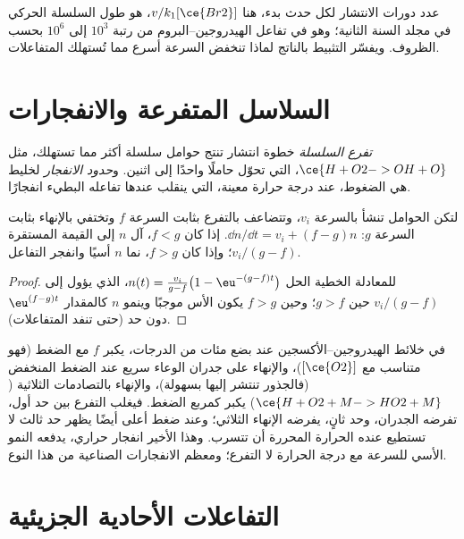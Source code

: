 عدد دورات الانتشار لكل حدث بدء، هنا $v/k_1[\ce{Br2}]$، هو
طول السلسلة الحركي في مجلد السنة الثانية؛ وهو في تفاعل الهيدروجين--البروم
من رتبة $10^3$ إلى $10^6$ بحسب الظروف. ويفسّر التثبيط بالناتج
لماذا تنخفض السرعة أسرع مما تُستهلك المتفاعلات.

\section{السلاسل المتفرعة والانفجارات}

\begin{definition}\label{def:b3:complex-kinetics:branching}
\emph{تفرع السلسلة} خطوة انتشار تنتج
حوامل سلسلة أكثر مما تستهلك، مثل $\ce{H + O2 -> OH + O}$، التي تحوّل
حاملًا واحدًا إلى اثنين. و\emph{حدود الانفجار} لخليط
هي الضغوط، عند درجة حرارة معينة، التي ينقلب عندها تفاعله البطيء
انفجارًا.
\end{definition}

\begin{proposition}\label{prop:b3:complex-kinetics:branching}
لتكن الحوامل تنشأ بالسرعة $v_i$، وتتضاعف بالتفرع بثابت السرعة
$f$ وتختفي بالإنهاء بثابت السرعة $g$:
$\dd n/\dd t = v_i + (f - g)n$. إذا كان $f < g$، آل $n$ إلى القيمة المستقرة $v_i/(g - f)$؛ وإذا كان
$f > g$، نما $n$ أسيًا وانفجر التفاعل.
\end{proposition}

\begin{proof}
للمعادلة الخطية الحل $n(t) = \frac{v_i}{g - f}\bigl(1 - \eu^{-(g - f)t}\bigr)$، الذي
يؤول إلى $v_i/(g - f)$ حين $g > f$؛ وحين $f > g$ يكون الأس موجبًا وينمو $n$
كالمقدار $\eu^{(f - g)t}$ دون حد (حتى تنفد المتفاعلات).
\end{proof}

في خلائط الهيدروجين--الأكسجين عند بضع مئات من الدرجات، يكبر $f$ مع
الضغط (فهو متناسب مع $[\ce{O2}]$)، والإنهاء على جدران
الوعاء سريع عند الضغط المنخفض (فالجذور تنتشر إليها بسهولة)، 
والإنهاء بالتصادمات الثلاثية ($\ce{H + O2 + M -> HO2 + M}$) يكبر كمربع
الضغط. فيغلب التفرع بين حد أول، تفرضه الجدران، 
وحد ثانٍ، يفرضه الإنهاء الثلاثي؛ وعند ضغط أعلى أيضًا يظهر حد
ثالث لا تستطيع عنده الحرارة المحررة أن تتسرب. وهذا الأخير
انفجار حراري، يدفعه النمو الأسي للسرعة مع درجة
الحرارة لا التفرع؛ ومعظم الانفجارات الصناعية من هذا
النوع.

\section{التفاعلات الأحادية الجزيئية}

